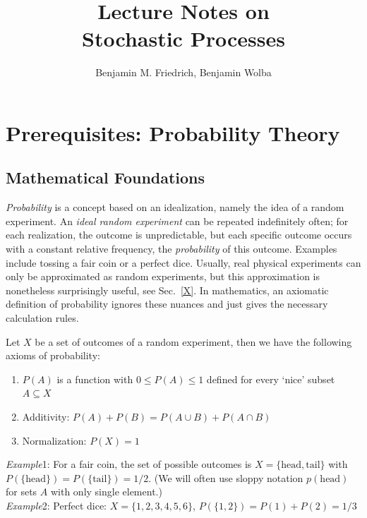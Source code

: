 \documentclass{notebook}
\title{\color{bluebase} Lecture Notes on\\ Stochastic Processes}
\author{Benjamin M. Friedrich, Benjamin Wolba}
\newcommand{\Example}{\textit{Example}}
\begin{document}
	
	
\frontmatter

\maketitle

\tableofcontents

\mainmatter

\chapter{Prerequisites: Probability Theory}

\section{Mathematical Foundations}

\textit{Probability} is a concept based on an idealization, 
namely the idea of a random experiment. 
An \textit{ideal random experiment} can be repeated indefinitely often;
for each realization, the outcome is unpredictable, 
but each specific outcome occurs with a constant relative frequency, the \textit{probability} of this outcome.
Examples include tossing a fair coin or a perfect dice.
Usually, real physical experiments can only be approximated as random experiments, 
but this approximation is nonetheless surprisingly useful, see Sec.~\ref{X}.
In mathematics, an axiomatic definition of probability ignores these nuances 
and just gives the necessary calculation rules. 

\begin{theorem}
	Let $X$ be a set of outcomes of a random experiment, 
	then we have the following axioms of probability:
	\begin{enumerate}
		\item{$P(A)$ is a function with $0 \leq P(A) \leq 1$ defined for every `nice' subset $A \subseteq X$}
		\item{Additivity: $P(A) + P(B) = P(A \cup B) + P(A \cap B)$}
		\item{Normalization: $P(X) = 1$}
	\end{enumerate}
\end{theorem}
\Example 1: For a fair coin, the set of possible outcomes is $X=\{\text{head},\text{tail}\}$
with $P(\{\text{head}\})=P(\{\text{tail}\})=1/2$. 
(We will often use sloppy notation $p(\text{head})$ for sets $A$ with only single element.)\\
\Example 2: Perfect dice: $X=\{1,2,3,4,5,6\}$, $P(\{1,2\})=P(1)+P(2)=1/3$
\end{document}
